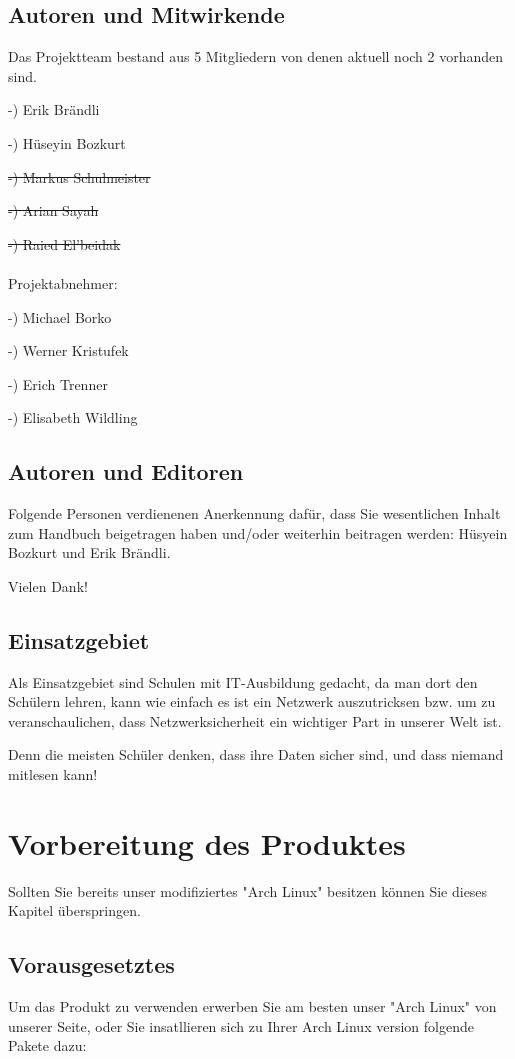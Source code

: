 \documentclass[11pt]{article} %
\begin{document}
\subsection{Autoren und Mitwirkende}

Das Projektteam bestand aus 5 Mitgliedern von denen aktuell noch 2 vorhanden sind. 

-) Erik Brändli 

-) Hüseyin Bozkurt

\sout{-) Markus Schulmeister}

\sout{-) Arian Sayah} 

\sout{-) Raied El'beidak}
\\ \\
Projektabnehmer:

-) Michael Borko

-) Werner Kristufek

-) Erich Trenner

-) Elisabeth Wildling

\subsection{Autoren und Editoren}

Folgende Personen verdienenen Anerkennung dafür, dass Sie wesentlichen Inhalt zum Handbuch beigetragen haben und/oder weiterhin beitragen werden: Hüsyein Bozkurt und Erik Brändli.

Vielen Dank!\\

\subsection{Einsatzgebiet}

Als Einsatzgebiet sind Schulen mit IT-Ausbildung gedacht, da man dort den Schülern lehren, kann wie einfach es ist ein Netzwerk auszutricksen bzw. um zu veranschaulichen, dass Netzwerksicherheit ein wichtiger Part in unserer Welt ist.

Denn die meisten Schüler denken, dass ihre Daten sicher sind, und dass niemand mitlesen kann!

\section{Vorbereitung des Produktes}
Sollten Sie bereits unser modifiziertes "Arch Linux" besitzen können Sie dieses Kapitel überspringen.
\subsection{Vorausgesetztes}
Um das Produkt zu verwenden erwerben Sie am besten unser "Arch Linux" von unserer Seite, oder Sie insatllieren sich zu Ihrer Arch Linux version folgende Pakete dazu:
\end{document}
